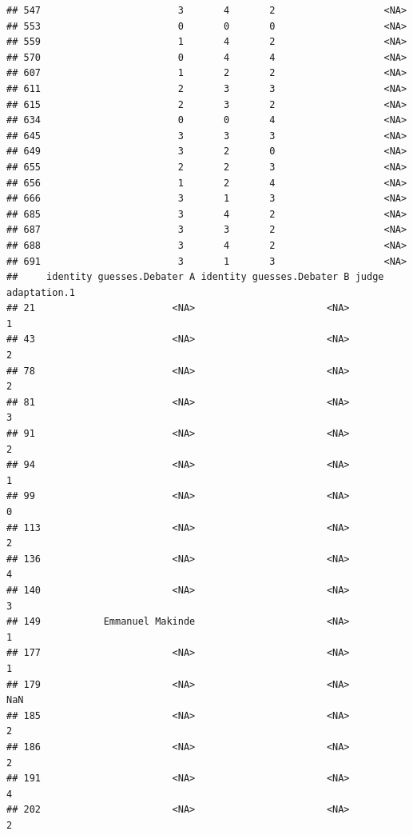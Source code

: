 \documentclass[
]{article}
\begin{document}
\begin{verbatim}
## 547                        3       4       2                   <NA>
## 553                        0       0       0                   <NA>
## 559                        1       4       2                   <NA>
## 570                        0       4       4                   <NA>
## 607                        1       2       2                   <NA>
## 611                        2       3       3                   <NA>
## 615                        2       3       2                   <NA>
## 634                        0       0       4                   <NA>
## 645                        3       3       3                   <NA>
## 649                        3       2       0                   <NA>
## 655                        2       2       3                   <NA>
## 656                        1       2       4                   <NA>
## 666                        3       1       3                   <NA>
## 685                        3       4       2                   <NA>
## 687                        3       3       2                   <NA>
## 688                        3       4       2                   <NA>
## 691                        3       1       3                   <NA>
##     identity guesses.Debater A identity guesses.Debater B judge adaptation.1
## 21                        <NA>                       <NA>                  1
## 43                        <NA>                       <NA>                  2
## 78                        <NA>                       <NA>                  2
## 81                        <NA>                       <NA>                  3
## 91                        <NA>                       <NA>                  2
## 94                        <NA>                       <NA>                  1
## 99                        <NA>                       <NA>                  0
## 113                       <NA>                       <NA>                  2
## 136                       <NA>                       <NA>                  4
## 140                       <NA>                       <NA>                  3
## 149           Emmanuel Makinde                       <NA>                  1
## 177                       <NA>                       <NA>                  1
## 179                       <NA>                       <NA>                NaN
## 185                       <NA>                       <NA>                  2
## 186                       <NA>                       <NA>                  2
## 191                       <NA>                       <NA>                  4
## 202                       <NA>                       <NA>                  2

\end{verbatim}
\end{document}
